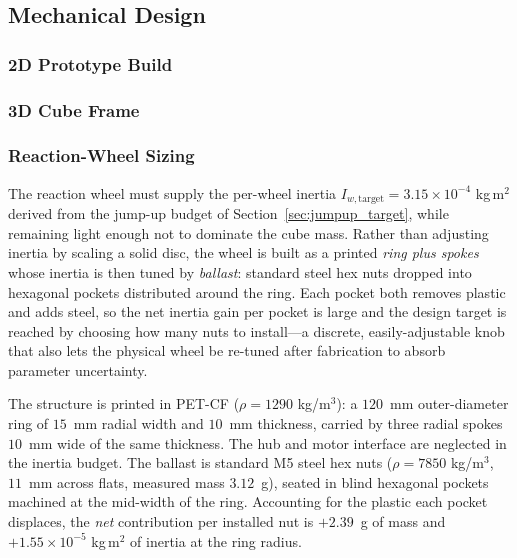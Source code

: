 \subsection{Mechanical Design}
\label{sec:mechanical}

\subsubsection{2D Prototype Build}


\subsubsection{3D Cube Frame}


\subsubsection{Reaction-Wheel Sizing}
\label{sec:rw_sizing}

The reaction wheel must supply the per-wheel inertia
$I_{w,\text{target}} = 3.15\times10^{-4}$ kg\,m$^2$ derived from the jump-up
budget of Section~\ref{sec:jumpup_target}, while remaining light enough not to
dominate the cube mass. Rather than adjusting inertia by scaling a solid disc,
the wheel is built as a printed \emph{ring plus spokes} whose inertia is then
tuned by \emph{ballast}: standard steel hex nuts dropped into hexagonal pockets
distributed around the ring. Each pocket both removes plastic and adds steel, so
the net inertia gain per pocket is large and the design target is reached by
choosing how many nuts to install---a discrete, easily-adjustable knob that also
lets the physical wheel be re-tuned after fabrication to absorb parameter
uncertainty.

The structure is printed in PET-CF ($\rho = 1290$ kg/m$^3$): a
$120$~mm outer-diameter ring of $15$~mm radial width and $10$~mm thickness,
carried by three radial spokes $10$~mm wide of the same thickness. The hub and
motor interface are neglected in the inertia budget. The ballast is standard
M5 steel hex nuts ($\rho = 7850$ kg/m$^3$, $11$~mm across flats,
measured mass $3.12$~g), seated in blind hexagonal pockets machined at the
mid-width of the ring. Accounting for the plastic each pocket displaces, the
\emph{net} contribution per installed nut is $+2.39$~g of mass and
$+1.55\times10^{-5}$ kg\,m$^2$ of inertia at the ring radius.

